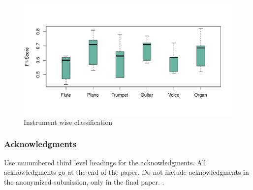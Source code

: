 \documentclass{article}
\begin{document}
\begin{figure}
	\centering
	\includegraphics[width=0.8\linewidth]{instr-f1}
	\caption{Instrument wise classification}
	\label{fig:instrument-f1}
\end{figure}







\subsubsection*{Acknowledgments}

Use unnumbered third level headings for the acknowledgments. All acknowledgments
go at the end of the paper. Do not include acknowledgments in the anonymized
submission, only in the final paper. 
 . 
\end{document}
